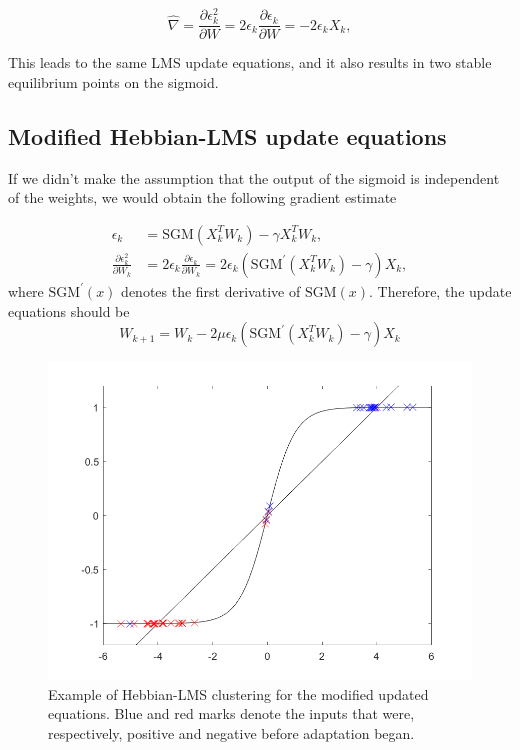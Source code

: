 \documentclass[a4paper]{article}
\begin{document}
\begin{equation}
\hat{\nabla} = \frac{\partial\epsilon_k^2}{\partial W} = 2\epsilon_k\frac{\partial\epsilon_k}{\partial W} = -2\epsilon_kX_k,
\end{equation}

This leads to the same LMS update equations, and it also results in two stable equilibrium points on the sigmoid. 

\subsection{Modified Hebbian-LMS update equations}
If we didn't make the assumption that the output of the sigmoid is independent of the weights, we would obtain the following gradient estimate

\begin{align}
\epsilon_k &= \mathrm{SGM}(X_k^TW_k) - \gamma X_k^TW_k, \\
\frac{\partial\epsilon_k^2}{\partial W_k} &= 2\epsilon_k\frac{\partial \epsilon_k}{\partial W_k} = 2\epsilon_k(\mathrm{SGM}^\prime(X_k^TW_k) - \gamma)X_k,
\end{align}
where $\mathrm{SGM}^\prime(x)$ denotes the first derivative of $\mathrm{SGM}(x)$. Therefore, the update equations should be
\begin{equation}
W_{k+1} = W_k - 2\mu\epsilon_k(\mathrm{SGM}^\prime(X_k^TW_k) - \gamma)X_k
\end{equation}
	
\begin{figure}[t!]
	\centering
	\includegraphics[scale=0.6]{figs/example-modified-hlms.png}
	\caption{Example of Hebbian-LMS clustering for the modified updated equations. Blue and red marks denote the inputs that were, respectively, positive and negative before adaptation began.}
	\label{fig:example-modified-hlms}
\end{figure}
	
\end{document}
